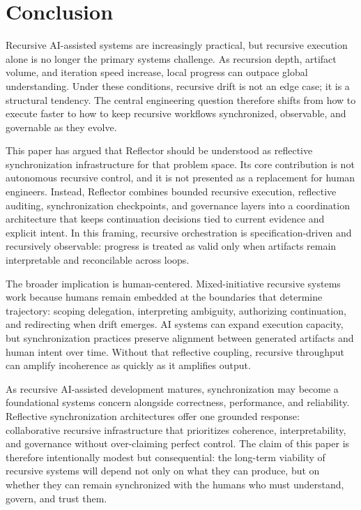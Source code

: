 \section{Conclusion}
\label{sec:conclusion}

Recursive AI-assisted systems are increasingly practical, but recursive execution alone is no longer the primary systems challenge. As recursion depth, artifact volume, and iteration speed increase, local progress can outpace global understanding. Under these conditions, recursive drift is not an edge case; it is a structural tendency. The central engineering question therefore shifts from how to execute faster to how to keep recursive workflows synchronized, observable, and governable as they evolve.

This paper has argued that Reflector should be understood as reflective synchronization infrastructure for that problem space. Its core contribution is not autonomous recursive control, and it is not presented as a replacement for human engineers. Instead, Reflector combines bounded recursive execution, reflective auditing, synchronization checkpoints, and governance layers into a coordination architecture that keeps continuation decisions tied to current evidence and explicit intent. In this framing, recursive orchestration is specification-driven and recursively observable: progress is treated as valid only when artifacts remain interpretable and reconcilable across loops.

The broader implication is human-centered. Mixed-initiative recursive systems work because humans remain embedded at the boundaries that determine trajectory: scoping delegation, interpreting ambiguity, authorizing continuation, and redirecting when drift emerges. AI systems can expand execution capacity, but synchronization practices preserve alignment between generated artifacts and human intent over time. Without that reflective coupling, recursive throughput can amplify incoherence as quickly as it amplifies output.

As recursive AI-assisted development matures, synchronization may become a foundational systems concern alongside correctness, performance, and reliability. Reflective synchronization architectures offer one grounded response: collaborative recursive infrastructure that prioritizes coherence, interpretability, and governance without over-claiming perfect control. The claim of this paper is therefore intentionally modest but consequential: the long-term viability of recursive systems will depend not only on what they can produce, but on whether they can remain synchronized with the humans who must understand, govern, and trust them.
